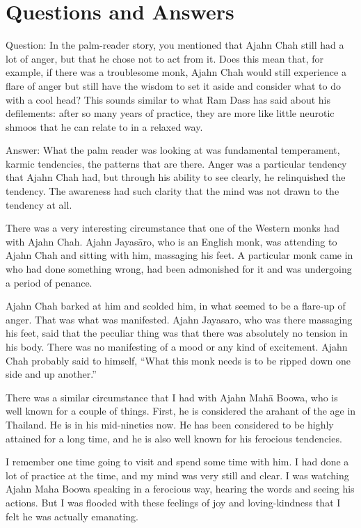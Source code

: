 \chapter{Questions and Answers}

\qaspace
Question: In the palm-reader story, you mentioned that Ajahn Chah still
had a lot of anger, but that he chose not to act from it. Does this mean
that, for example, if there was a troublesome monk, Ajahn Chah would
still experience a flare of anger but still have the wisdom to set it
aside and consider what to do with a cool head? This sounds similar to
what Ram Dass has said about his defilements: after so many years of
practice, they are more like little neurotic shmoos that he can relate
to in a relaxed way.

\qaspace
Answer: What the palm reader was looking at was fundamental temperament,
karmic tendencies, the patterns that are there. Anger was a particular
tendency that Ajahn Chah had, but through his ability to see clearly, he
relinquished the tendency. The awareness had such clarity that the mind
was not drawn to the tendency at all.

There was a very interesting circumstance that one of the Western monks
had with Ajahn Chah. Ajahn Jayasāro, who is an English monk, was
attending to Ajahn Chah and sitting with him, massaging his feet. A
particular monk came in who had done something wrong, had been
admonished for it and was undergoing a period of penance.

Ajahn Chah barked at him and scolded him, in what seemed to be a
flare-up of anger. That was what was manifested. Ajahn Jayasaro, who was
there massaging his feet, said that the peculiar thing was that there
was absolutely no tension in his body. There was no manifesting of a
mood or any kind of excitement. Ajahn Chah probably said to himself,
“What this monk needs is to be ripped down one side and up another.”

There was a similar circumstance that I had with Ajahn Mahā Boowa, who
is well known for a couple of things. First, he is considered the
arahant of the age in Thailand. He is in his mid-nineties now. He has
been considered to be highly attained for a long time, and he is also
well known for his ferocious tendencies.

I remember one time going to visit and spend some time with him. I had
done a lot of practice at the time, and my mind was very still and
clear. I was watching Ajahn Maha Boowa speaking in a ferocious way,
hearing the words and seeing his actions. But I was flooded with these
feelings of joy and loving-kindness that I felt he was actually
emanating.

